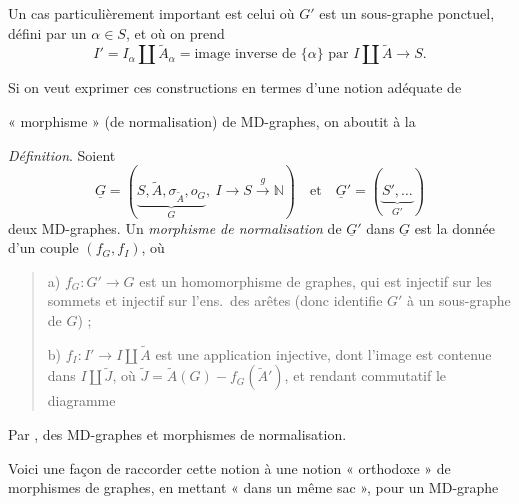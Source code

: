 \documentclass[11pt,a4paper]{article}
\begin{document}
Un cas particulièrement important est celui où $G'$ est un sous-graphe ponctuel,  défini par un $\alpha \in S$, et où on prend
\[
I' = I_{\alpha} \amalg \tilde{A}_{\alpha} = \text{image inverse de } \{\alpha\} \text{ par } I \amalg \tilde{A} \to S .
\]

Si on veut exprimer ces constructions en termes d'une notion adéquate de

« morphisme » (de normalisation) de MD-graphes, on aboutit à la

\emph{Définition}. Soient
\[
\underline{G} = (\underbrace{S,\tilde{A},\sigma_{\tilde{A}},o_{G}}_{G},\ I \to S \xrightarrow{\ g\ } \mathbb{N})
\quad\text{et}\quad
\underline{G}' = (\underbrace{S',\dots}_{G'})
\]
deux MD-graphes. Un \emph{morphisme de \struck{\ill{}} normalisation} de $\underline{G}'$ dans $\underline{G}$ est la donnée d'un couple $(f_{G},f_{I})$, où
\begin{quote}
a) $f_{G} : G' \to G$ est un homomorphisme de graphes, qui est injectif sur les sommets et injectif sur l'ens.\ des arêtes (donc identifie $G'$ à un sous-graphe de $G$) ;

b) $f_{I} : I' \to I \amalg \tilde{A}$ \struck{\ill{}} est une application injective, dont l'image est contenue dans $I \amalg \tilde{J}$, où $\tilde{J} = \tilde{A}(G) - f_{G}(\tilde{A}')$, et rendant commutatif le diagramme
\end{quote}



Par ,  des MD-graphes et morphismes de normalisation. \struck{\ill{}}

Voici une façon de raccorder cette notion à une notion « orthodoxe » de morphismes de graphes, en mettant « dans un même sac », pour un MD-graphe
\end{document}
